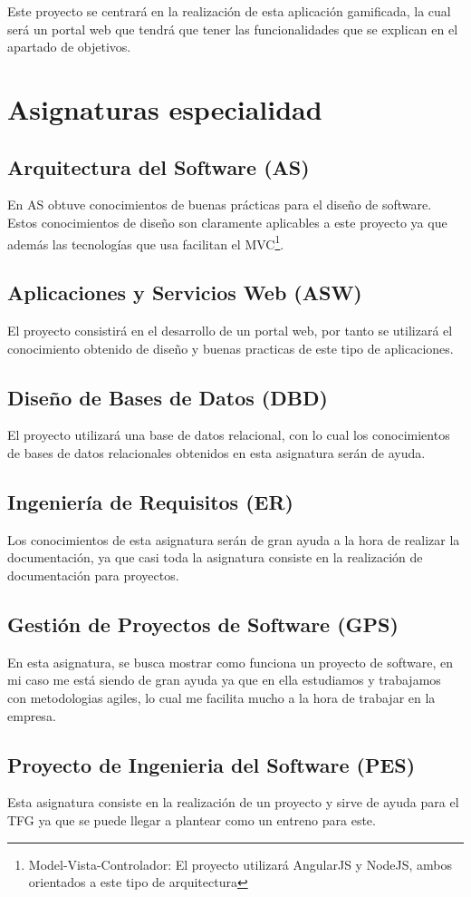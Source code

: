 Este proyecto se centrará en la realización de esta aplicación gamificada, la cual será un portal web que tendrá que tener las funcionalidades que se explican en el apartado de objetivos.
\clearpage
\section{Asignaturas especialidad}
\subsection{Arquitectura del Software (AS)}
En AS obtuve conocimientos de buenas prácticas para el diseño de software. Estos conocimientos de diseño son claramente aplicables a este proyecto ya que además las tecnologías que usa facilitan el MVC\footnote{Model-Vista-Controlador: El proyecto utilizará AngularJS y NodeJS, ambos orientados a este tipo de arquitectura}.
\subsection{Aplicaciones y Servicios Web (ASW)}
El proyecto consistirá en el desarrollo de un portal web, por tanto se utilizará el conocimiento obtenido de diseño y buenas practicas de este tipo de aplicaciones.
\subsection{Diseño de Bases de Datos (DBD)}
El proyecto utilizará una base de datos relacional, con lo cual los conocimientos de bases de datos relacionales obtenidos en esta asignatura serán de ayuda.
\subsection{Ingeniería de Requisitos (ER)}
Los conocimientos de esta asignatura serán de gran ayuda a la hora de realizar la documentación, ya que casi toda la asignatura consiste en la realización de documentación para proyectos.
\subsection{Gestión de Proyectos de Software (GPS)}
En esta asignatura, se busca mostrar como funciona un proyecto de software, en mi caso me está siendo de gran ayuda ya que en ella estudiamos y trabajamos con metodologias agiles, lo cual me facilita mucho a la hora de trabajar en la empresa.
\subsection{Proyecto de Ingenieria del Software (PES)}
Esta asignatura consiste en la realización de un proyecto y sirve de ayuda para el TFG ya que se puede llegar a plantear como un entreno para este.
